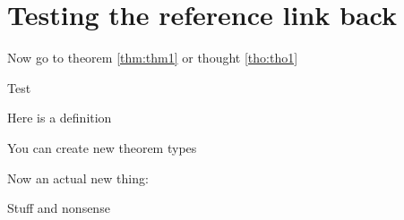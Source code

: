 \documentclass[
  12pt,
  a4paper]{extarticle}
\theoremstyle{plain}
\theoremstyle{definition}
\theoremstyle{plain}
\theoremstyle{plain}
\theoremstyle{plain}
\theoremstyle{definition}
\theoremstyle{definition}
\theoremstyle{definition}
\theoremstyle{remark}
\theoremstyle{plain}
\let\BeginKnitrBlock\begin \let\EndKnitrBlock\end
\renewcommand{\;}{\,}
\begin{document}
\hypertarget{testing-the-reference-link-back}{%
\section{Testing the reference link back}\label{testing-the-reference-link-back}}

Now go to theorem \ref{thm:thm1} or thought \ref{tho:tho1}

\BeginKnitrBlock{solution*}
Test
\EndKnitrBlock{solution*}
\begingroup\renewcommand{\thedefinition}{\ref{def:truth}}
\BeginKnitrBlock{definition}
{ }Here is a definition
\EndKnitrBlock{definition}
\endgroup\addtocounter{definition}{-1}\begingroup\renewcommand{\theThought}{\ref{tho:tho1}}
\BeginKnitrBlock{Thought}[Bar of \ref{thm:thm1}]
{}You can create new theorem types
\EndKnitrBlock{Thought}
\endgroup\addtocounter{Thought}{-1}
Now an actual new thing:
\BeginKnitrBlock{Thought}
{\label{tho:tho2}}Stuff and nonsense
\EndKnitrBlock{Thought}
\end{document}
